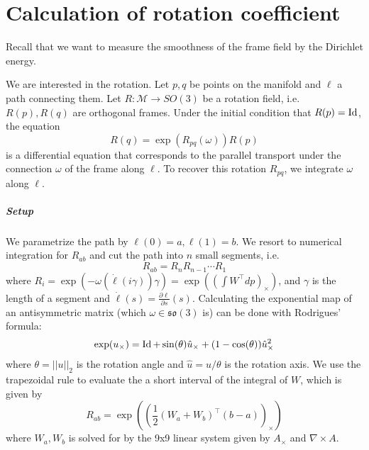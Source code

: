 \documentclass[../thesis.tex]{subfiles}
\begin{document}
\newcommand{\str}[1]{\textsc{#1}}
\newcommand{\var}[1]{\textit{#1}}
\newcommand{\op}[1]{\textsl{#1}}
\def \ifempty#1{\def\temp{#1} \ifx\temp\empty }
\newcommand{\msg}[2]{\ensuremath{\ifempty{#2} [\str{#1}] \else [\str{#1}, {#2}] \fi}}
\newcommand{\tup}[1]{\ensuremath{\langle #1 \rangle}}
\newcommand{\nil}{\ensuremath{\bot}}
\newcommand{\false}{\textsc{false}\xspace}
\newcommand{\true}{\textsc{true}\xspace}

\newcommand\lastts{\var{lastts}\xspace}
\newcommand\nextts{\var{nextts}\xspace}
\newcommand\trusted{\var{trusted}\xspace}
\newcommand\newepoch{\var{newepoch}\xspace}
\newcommand\leader{\var{leader}\xspace}
\newcommand\ts{\var{ts}\xspace}
\newcommand{\CK}{\ensuremath{\mathcal{K}}\xspace}
\newcommand{\CP}{\ensuremath{\mathcal{P}}\xspace}
\newcommand{\CQ}{\ensuremath{\mathcal{Q}}\xspace}


\chapter{Calculation of rotation coefficient}
\label{ch:calculation}
Recall that we want to measure the smoothness of the frame field
by the Dirichlet energy. 



We are interested in the rotation.
Let $p,q$ be points on the manifold and $\ell$ a path connecting them.
Let $R: \mathcal{M} \to SO(3)$ be a rotation field, i.e. $R(p), R(q)$ are orthogonal frames.
Under the initial condition that $R(p)= \operatorname{Id}$, the equation
$$R(q)= \exp(R_{pq}(\omega))R(p)$$
is a differential equation that corresponds to the parallel transport under the connection $\omega$
of the frame along $\ell$.
To recover this rotation $R_{pq}$, we integrate $\omega$ along $\ell$.
\paragraph{Setup}
We parametrize the path by $\ell(0)=a, \ell(1)=b$.
We resort to numerical integration for $R_{ab}$ and cut the path into $n$ small segments, i.e.
$$R_{ab}= R_nR_{n-1} \dotsb R_1$$
where $R_i = \exp(-\omega (\dot{\ell}(i\gamma))\gamma) = \exp((\int W^{\top}dp)_{\times})$, and $\gamma$ is the length of a segment and $\dot{\ell}(s)=\frac{\partial \ell}{\partial s}(s)$.
Calculating the exponential map of an antisymmetric matrix (which $\omega \in \mathfrak{so}(3)$ is) can be done with Rodrigues' formula:
$$\exp(u_{\times}) = \operatorname{Id} + \sin(\theta) \hat{u}_{\times} + (1-\cos(\theta)) \hat{u}_{\times}^2$$
where $\theta = ||u||_2$ is the rotation angle and $\hat{u}= u/\theta$ is the rotation axis.
We use the trapezoidal rule to evaluate the a short interval of the integral of $W$, which is given by
$$R_{ab}=\exp \left( \left(\frac{1}{2}(W_a + W_b)^{\top}(b-a)\right)_{\times}\right)$$
where $W_a, W_b$ is solved for by the 9x9 linear system given by $A_{\times}$ and $\nabla \times A$.
\end{document}
